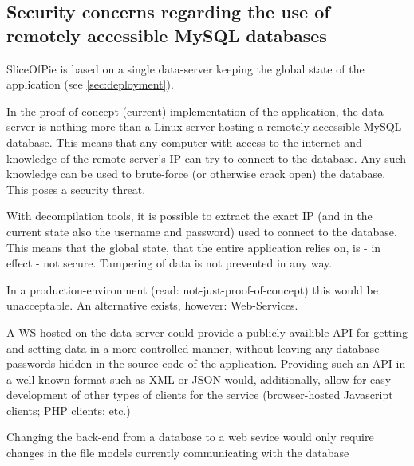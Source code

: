 \subsection{Security concerns regarding the use of remotely accessible MySQL databases}
\label{sec:mysqlvswebservice}

SliceOfPie is based on a single data-server keeping the global state of the application (see \ref{sec:deployment}).

In the proof-of-concept (current) implementation of the application, the data-server is nothing more than a Linux-server
hosting a remotely accessible MySQL database. This means that any computer with access to the internet and knowledge of
the remote server's IP can try to connect to the database. Any such knowledge can be used to brute-force (or otherwise
crack open) the database. This poses a security threat.

With decompilation tools, it is possible to extract the exact IP (and in the current state also the username and password)
used to connect to the database. This means that the global state, that the entire application relies on, is - in effect -
not secure. Tampering of data is not prevented in any way.

In a production-environment (read: not-just-proof-of-concept) this would be unacceptable. An alternative exists, however:
Web-Services.

A WS hosted on the data-server could provide a publicly availible API for getting and setting data in a more controlled manner,
without leaving any database passwords hidden in the source code of the application. Providing such an API in a well-known format
such as XML or JSON\cite{ibmREST} would, additionally, allow for easy development of other types of clients for the service (browser-hosted
Javascript clients; PHP clients; etc.)

Changing the back-end from a database to a web sevice would only require changes in the file models currently communicating
with the database